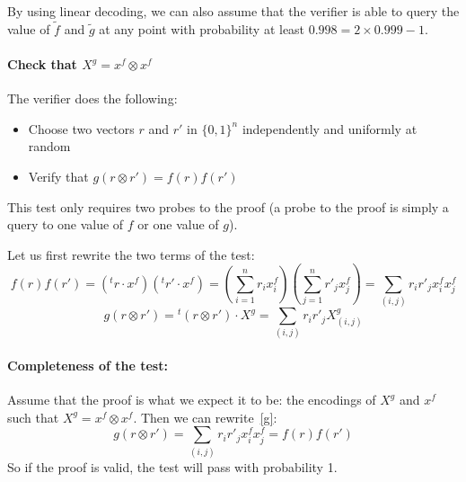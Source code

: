By using linear decoding, we can also assume that the verifier is able to query
the value of $\tilde{f}$ and $\tilde{g}$ at any point with probability at least
$0.998=2 \times 0.999 -1$.

\paragraph{Check that $X^g = x^f\otimes x^f$}

The verifier does the following: 
\begin{itemize}
\item Choose two vectors $r$ and $r'$ in $\{0,1\}^n$ independently and
uniformly at random
\item Verify that $g(r\otimes r') = f(r)f(r')$ 
\end{itemize}
This test only requires two probes to the proof (a probe to the proof is
simply a query to one value of $f$ or one value of $g$).

Let us first rewrite the two terms of the test:
\begin{equation}\label{f}
f(r)f(r') = \left({}^tr\cdot x^f\right)\left({}^tr'\cdot x^f\right) 
= \left(\sum_{i=1}^n r_ix^f_i\right) \left(\sum_{j=1}^n r'_jx^f_j\right)
= \sum_{(i,j)} r_ir'_jx^f_ix^f_j
\end{equation}
\begin{equation}\label{g}
g(r\otimes r') = {}^t(r\otimes r')\cdot X^g=\sum_{(i,j)}r_ir'_jX^g_{(i,j)}
\end{equation}

\paragraph{Completeness of the test:} Assume that the proof is what we expect it
to be: the encodings of $X^g$ and $x^f$ such that $X^g = x^f\otimes x^f$. Then
we can rewrite~\eqref{g}:
\begin{displaymath}
g(r\otimes r') = \sum_{(i,j)}r_ir'_jx^f_ix^f_j = f(r)f(r')
\end{displaymath}
So if the proof is valid, the test will pass with probability 1.

